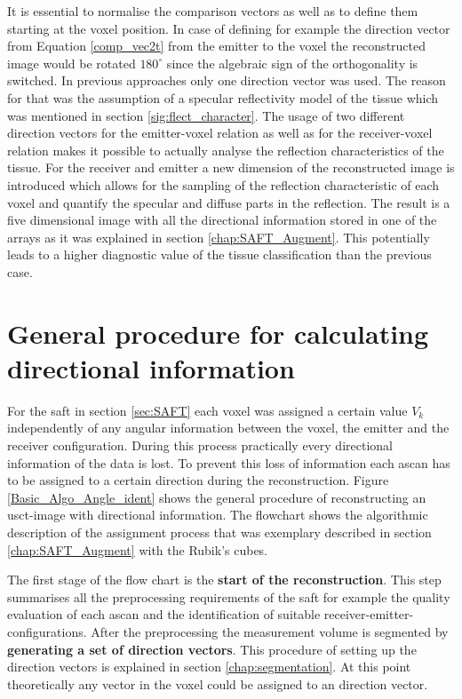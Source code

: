 It is essential to normalise the comparison vectors as well as to define them starting at the voxel position. In case of defining for example the direction vector from Equation \ref{comp_vec2t} from the emitter to the voxel the reconstructed image would be rotated $180^{\circ}$ since the algebraic sign of the orthogonality is switched.
In previous approaches only one direction vector was used. The reason for that was the assumption of a specular reflectivity model of the tissue which was mentioned in section \ref{sig:flect_character}. The usage of two different direction vectors for the emitter-voxel relation as well as for the receiver-voxel relation makes it possible to actually analyse the reflection characteristics of the tissue. For the receiver and emitter a new dimension of the reconstructed image is introduced which allows for the sampling of the reflection characteristic of each voxel and quantify the specular and diffuse parts in the reflection. The result is a five dimensional image with all the directional information stored in one of the arrays as it was explained in section \ref{chap:SAFT_Augment}. This potentially leads to a higher diagnostic value of the tissue classification than the previous case.



\section{General procedure for calculating directional information}
\label{chap:algo_for_direction_recon}


For the \ac{saft} in section \ref{sec:SAFT} each voxel was assigned a certain value $V_k$ independently of any angular information between the voxel, the emitter and the receiver configuration. During this process practically every directional information of the data is lost. To prevent this loss of information each \ac{ascan} has to be assigned to a certain direction during the reconstruction. Figure \ref{Basic_Algo_Angle_ident} shows the general procedure of reconstructing an \ac{usct}-image with directional information. The flowchart shows the algorithmic description of the assignment process that was exemplary described in section \ref{chap:SAFT_Augment} with the Rubik's cubes.

The first stage of the flow chart is the \textbf{start of the reconstruction}. This step summarises all the preprocessing requirements of the \ac{saft} for example the quality evaluation of each \ac{ascan} and the identification of suitable receiver-emitter-configurations.
After the preprocessing the measurement volume is segmented by \textbf{generating a set of direction vectors}. This procedure of setting up the direction vectors is explained in section \ref{chap:segmentation}. At this point theoretically any vector in the voxel could be assigned to an direction vector. 

